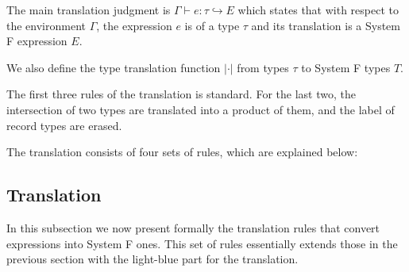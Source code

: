 The main translation judgment is $ \Gamma \vdash e : \tau \hookrightarrow E $ which
states that with respect to the environment $ \Gamma $, the \name expression
$ e $ is of a \name type $ \tau $ and its translation is a System F expression $ E $.

We also define the type translation function $ | \cdot | $ from \name types
$ \tau $ to System F types $ T $.

The first three rules of the translation is standard. For the last two, the
intersection of two types are translated into a product of them, and the label
of record types are erased.

The translation consists of four sets of rules, which are explained below:

\subsection{Translation}

In this subsection we now present formally the translation rules that convert
\name expressions into System F ones. This set of rules essentially extends
those in the previous section with the light-blue part for the translation.






